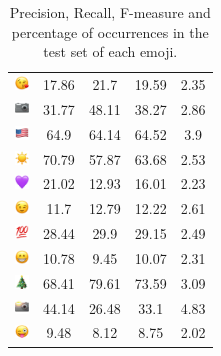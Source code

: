 \documentclass{article}
\begin{document}
\begin{table}
\begin{tabular}{|c|ccc|c|}
\includegraphics[height=0.37cm,width=0.37cm]{img/face_blowing_a_kiss.png} & 17.86 & 21.7 & 19.59 & 2.35\\ 
\includegraphics[height=0.37cm,width=0.37cm]{img/camera.png} & 31.77 & 48.11 & 38.27 & 2.86\\ 
\includegraphics[height=0.37cm,width=0.37cm]{img/United_States.png} & 64.9 & 64.14 & 64.52 & 3.9\\ 
\includegraphics[height=0.37cm,width=0.37cm]{img/sun.png} & 70.79 & 57.87 & 63.68 & 2.53\\ 
\includegraphics[height=0.37cm,width=0.37cm]{img/purple_heart.png} & 21.02 & 12.93 & 16.01 & 2.23\\ 
\includegraphics[height=0.37cm,width=0.37cm]{img/winking_face.png} & 11.7 & 12.79 & 12.22 & 2.61\\ 
\includegraphics[height=0.37cm,width=0.37cm]{img/hundred_points.png} & 28.44 & 29.9 & 29.15 & 2.49\\ 
\includegraphics[height=0.37cm,width=0.37cm]{img/beaming_face_with_smiling_eyes.png} & 10.78 & 9.45 & 10.07 & 2.31\\ 
\includegraphics[height=0.37cm,width=0.37cm]{img/Christmas_tree.png} & 68.41 & 79.61 & 73.59 & 3.09\\ 
\includegraphics[height=0.37cm,width=0.37cm]{img/camera_with_flash.png} & 44.14 & 26.48 & 33.1 & 4.83\\ 
\includegraphics[height=0.37cm,width=0.37cm]{img/winking_face_with_tongue.png} & 9.48 & 8.12 & 8.75 & 2.02\\ 

\hline
\end{tabular}
\caption{\label{table:emoji_detailed} Precision, Recall, F-measure and percentage of occurrences in the test set of each emoji.}
\end{table}
\end{document}
